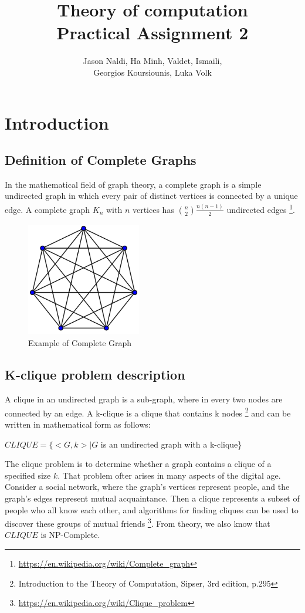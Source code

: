 \documentclass[12pt]{article}
\title{Theory of computation\\ Practical Assignment 2}
\author{Jason Naldi, Ha Minh, Valdet, Ismaili,\\ Georgios Koursiounis, Luka Volk}
\begin{document}
\maketitle

\section{Introduction}
\subsection{Definition of Complete Graphs}

In the mathematical field of graph theory, a complete graph is a simple undirected graph in which every pair of distinct vertices is connected by a unique edge. A complete graph $K_n$ with $n$ vertices has $\binom{n}{2}\frac{n(n-1)}{2}$ undirected edges \footnote{\url{https://en.wikipedia.org/wiki/Complete\_graph}}.

\begin{figure}[ht!]
    \centering
    \includegraphics[width=5cm, height=5cm]{Complete_graph.png}
    \caption{Example of Complete Graph}
\end{figure}

\subsection{K-clique problem description}

A clique in an undirected graph is a sub-graph, where in every two nodes are connected by an edge. A k-clique is a clique that contains k nodes
\footnote{Introduction to the Theory of Computation, Sipser, 3rd edition, p.295}
and can be written in mathematical form as follows:

\begin{center}
$CLIQUE = \{<G, k> | G$ is an undirected graph with a k-clique\}
\end{center}

The clique problem is to determine whether a graph contains a clique of a specified size $k$. That problem ofter arises in many aspects of the digital age. Consider a social network, where the graph's vertices represent people, and the graph's edges represent mutual acquaintance. Then a clique represents a subset of people who all know each other, and algorithms for finding cliques can be used to discover these groups of mutual friends
\footnote{\url{https://en.wikipedia.org/wiki/Clique\_problem}}. From theory, we also know that $CLIQUE$ is NP-Complete.
\end{document}
